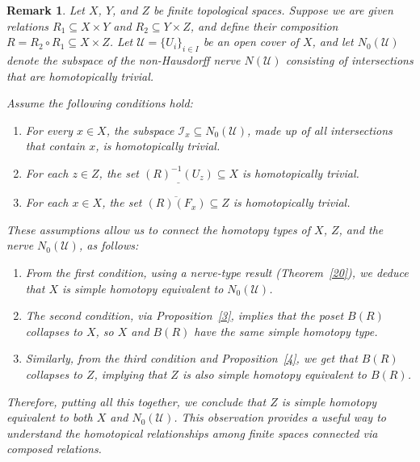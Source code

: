 \documentclass[12pt,a4paper,twoside, reqno, tbtags]{article}
\numberwithin{equation}{section}
\newtheorem{remark}{Remark}[section]
\begin{document}
    \begin{remark}\label{23}
    	Let \( X \), \( Y \), and \( Z \) be finite topological spaces. Suppose we are given relations \( R_1 \subseteq X \times Y \) and \( R_2 \subseteq Y \times Z \), and define their composition \( R = R_2 \circ R_1 \subseteq X \times Z \). Let \( \mathcal{U} = \{U_i\}_{i \in I} \) be an open cover of \( X \), and let \( N_0(\mathcal{U}) \) denote the subspace of the non-Hausdorff nerve \( N(\mathcal{U}) \) consisting of intersections that are homotopically trivial.
    	
    	Assume the following conditions hold:
    	\begin{enumerate}
    		\item For every \( x \in X \), the subspace \( \mathcal{I}_x \subseteq N_0(\mathcal{U}) \), made up of all intersections that contain \( x \), is homotopically trivial.
    		\item For each \( z \in Z \), the set \( \underline{(R)^{-1}(U_z)} \subseteq X \) is homotopically trivial.
    		\item For each \( x \in X \), the set \( \overline{(R)(F_x)} \subseteq Z \) is homotopically trivial.
    	\end{enumerate}
    	
    	These assumptions allow us to connect the homotopy types of \( X \), \( Z \), and the nerve \( N_0(\mathcal{U}) \), as follows:
    	\begin{enumerate}[label=\alph*.]
    		\item From the first condition, using a nerve-type result (Theorem~\ref{20}), we deduce that \( X \) is simple homotopy equivalent to \( N_0(\mathcal{U}) \).
    		\item The second condition, via Proposition~\ref{3}, implies that the poset \( B(R) \) collapses to \( X \), so \( X \) and \( B(R) \) have the same simple homotopy type.
    		\item Similarly, from the third condition and Proposition~\ref{4}, we get that \( B(R) \) collapses to \( Z \), implying that \( Z \) is also simple homotopy equivalent to \( B(R) \).
    	\end{enumerate}
    	
    	Therefore, putting all this together, we conclude that \( Z \) is simple homotopy equivalent to both \( X \) and \( N_0(\mathcal{U}) \). This observation provides a useful way to understand the homotopical relationships among finite spaces connected via composed relations.
    \end{remark}
\end{document}
